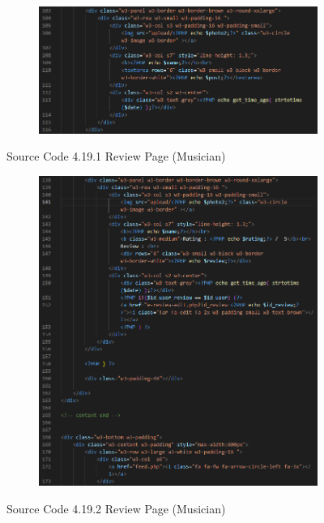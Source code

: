 \begin{enumerate}[1.]
\begin{figure}[h]
\begin{subfigure}[b]{0.8\textwidth}
            \label{fig:sub1}
        \end{subfigure}
        \hspace{0.04\textwidth}
        \begin{subfigure}[b]{0.8\textwidth}
            \centering
            \includegraphics[width=\textwidth]{mainmatter/images/frontend/code/mreview2.png}
            \label{fig:sub2}
        \end{subfigure}
        \caption*{Source Code 4.19.1 Review Page (Musician)}
        \label{fig:myfig58a}
    \end{figure}
    \clearpage
    \begin{figure}[h]\ContinuedFloat
        \centering
        \begin{subfigure}[b]{0.8\textwidth}
            \centering
            \includegraphics[width=\textwidth]{mainmatter/images/frontend/code/mreview3.png}
            \label{fig:sub3}
        \end{subfigure}
        \caption*{Source Code 4.19.2 Review Page (Musician)}
        \label{fig:myfig58b}
    \end{figure}
    \clearpage


\end{enumerate}
